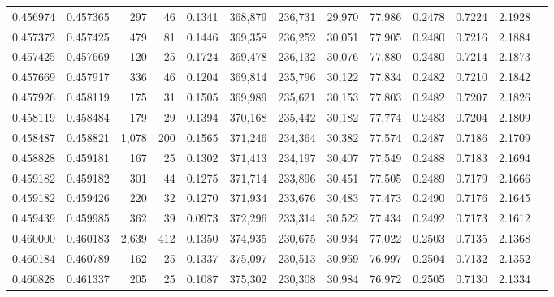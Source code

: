 \begin{tabular}{rrrrrrrrrrrrr}
0.456974 & 0.457365 &   297 &  46 &                                     0.1341 & 368,879 & 236,731 &  29,970 &  77,986 & 0.2478 & 0.7224 & 2.1928 \\
0.457372 & 0.457425 &   479 &  81 &                                     0.1446 & 369,358 & 236,252 &  30,051 &  77,905 & 0.2480 & 0.7216 & 2.1884 \\
0.457425 & 0.457669 &   120 &  25 &                                     0.1724 & 369,478 & 236,132 &  30,076 &  77,880 & 0.2480 & 0.7214 & 2.1873 \\
0.457669 & 0.457917 &   336 &  46 &                                     0.1204 & 369,814 & 235,796 &  30,122 &  77,834 & 0.2482 & 0.7210 & 2.1842 \\
0.457926 & 0.458119 &   175 &  31 &                                     0.1505 & 369,989 & 235,621 &  30,153 &  77,803 & 0.2482 & 0.7207 & 2.1826 \\
0.458119 & 0.458484 &   179 &  29 &                                     0.1394 & 370,168 & 235,442 &  30,182 &  77,774 & 0.2483 & 0.7204 & 2.1809 \\
0.458487 & 0.458821 & 1,078 & 200 &                                     0.1565 & 371,246 & 234,364 &  30,382 &  77,574 & 0.2487 & 0.7186 & 2.1709 \\
0.458828 & 0.459181 &   167 &  25 &                                     0.1302 & 371,413 & 234,197 &  30,407 &  77,549 & 0.2488 & 0.7183 & 2.1694 \\
0.459182 & 0.459182 &   301 &  44 &                                     0.1275 & 371,714 & 233,896 &  30,451 &  77,505 & 0.2489 & 0.7179 & 2.1666 \\
0.459182 & 0.459426 &   220 &  32 &                                     0.1270 & 371,934 & 233,676 &  30,483 &  77,473 & 0.2490 & 0.7176 & 2.1645 \\
0.459439 & 0.459985 &   362 &  39 &                                     0.0973 & 372,296 & 233,314 &  30,522 &  77,434 & 0.2492 & 0.7173 & 2.1612 \\
0.460000 & 0.460183 & 2,639 & 412 &                                     0.1350 & 374,935 & 230,675 &  30,934 &  77,022 & 0.2503 & 0.7135 & 2.1368 \\
0.460184 & 0.460789 &   162 &  25 &                                     0.1337 & 375,097 & 230,513 &  30,959 &  76,997 & 0.2504 & 0.7132 & 2.1352 \\
0.460828 & 0.461337 &   205 &  25 &                                     0.1087 & 375,302 & 230,308 &  30,984 &  76,972 & 0.2505 & 0.7130 & 2.1334 \\

\end{tabular}
